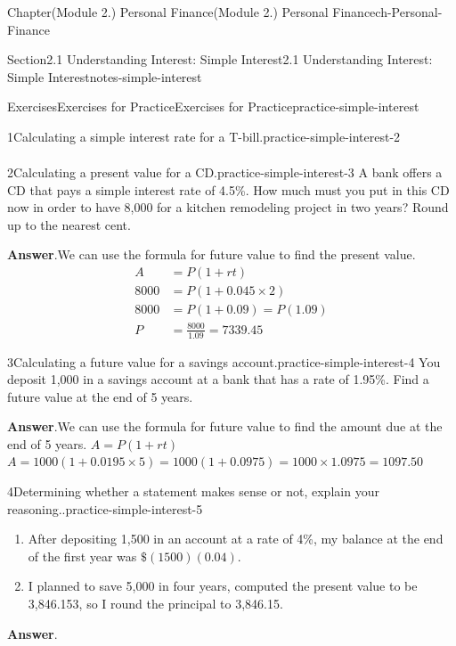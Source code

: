 \documentclass[oneside,10pt,]{book}
\newcommand{\blocktitlefont}{\relax}
\newcommand{\amp}{&}
\begin{document}
\begin{chapterptx}{Chapter}{(Module 2.) Personal Finance}{}{(Module 2.) Personal Finance}{}{}{ch-Personal-Finance}
\begin{sectionptx}{Section}{2.1 Understanding Interest: Simple Interest}{}{2.1 Understanding Interest: Simple Interest}{}{}{notes-simple-interest}
\begin{exercises-subsection-numberless}{Exercises}{Exercises for Practice}{}{Exercises for Practice}{}{}{practice-simple-interest}
\begin{divisionexercise}{1}{Calculating a simple interest rate for a T-bill.}{}{practice-simple-interest-2}
\begin{align*}
\end{align*}
\end{divisionexercise}%
\begin{divisionexercise}{2}{Calculating a present value for a CD.}{}{practice-simple-interest-3}%
A bank offers a CD that pays a simple interest rate of 4.5\%. How much must you put in this CD now in order to have \textdollar{}8,000 for a kitchen remodeling project in two years? Round up to the nearest cent.%
\par\smallskip%
\noindent\textbf{\blocktitlefont Answer}.\hypertarget{practice-simple-interest-3-3}{}\quad{}We can use the formula for future value to find the present value.%
%
\begin{align*}
A \amp =  P(1 + rt)\\
8000 \amp = P(1 + 0.045 \times 2)\\
8000 \amp = P(1 + 0.09) = P(1.09) \\
P \amp = \frac{8000}{1.09}  = 7339.45
\end{align*}
\end{divisionexercise}%
\begin{divisionexercise}{3}{Calculating a future value for a savings account.}{}{practice-simple-interest-4}%
You deposit \textdollar{}1,000 in a savings account at a bank that has a rate of 1.95\%. Find a future value at the end of 5 years.%
\par\smallskip%
\noindent\textbf{\blocktitlefont Answer}.\hypertarget{practice-simple-interest-4-3}{}\quad{}We can use the formula for future value to find the amount due at the end of 5 years. \(A = P(1 + rt)\) \(A = 1000(1 + 0.0195 \times 5) = 1000(1 + 0.0975) = 1000 \times 1.0975 = 1097.50\)%
\end{divisionexercise}%
\begin{divisionexercise}{4}{Determining whether a statement makes sense or not, explain your reasoning..}{}{practice-simple-interest-5}%
%
\begin{enumerate}[label={(\alph*)}]
\item{}After depositing \textdollar{}1,500 in an account at a rate of 4\%, my balance at the end of the first year was \(\$(1500)(0.04).\)%
\item{}I planned to save \textdollar{}5,000 in four years, computed the present value to be \textdollar{}3,846.153, so I round the principal to \textdollar{}3,846.15.%
\end{enumerate}
\par\smallskip%
\noindent\textbf{\blocktitlefont Answer}.\hypertarget{practice-simple-interest-5-3}{}\quad{}%

\end{divisionexercise}
\end{exercises-subsection-numberless}
\end{sectionptx}
\end{chapterptx}
\end{document}
